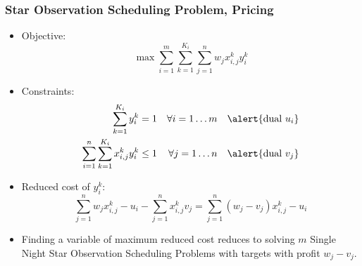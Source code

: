 \documentclass[10pt]{beamer}
\begin{document}
\begin{frame}
  \frametitle{Star Observation Scheduling Problem, Pricing}

  \begin{itemize}
    \item Objective:
      \begin{displaymath}
        \max \sum_{i = 1}^m \sum_{k = 1}^{K_i} \sum_{j = 1}^n w_j x_{i, j}^k y_i^k
      \end{displaymath}

    \item Constraints:
      \begin{align*}
        \sum_{k = 1}^{K_i} y_i^k = 1 && \forall i = 1 \dots m && \alert{\text{dual } u_i} \\
        \sum_{i = 1}^n \sum_{k = 1}^{K_i} x_{i, j}^k y_i^k \le 1 && \forall j = 1 \dots n && \alert{\text{dual } v_j} \\
      \end{align*}

    \item \pause Reduced cost of $y_i^k$:
      \begin{displaymath}
        \sum_{j = 1}^n w_j x_{i, j}^k - u_i - \sum_{j = 1}^n x_{i, j}^k v_j
        = \sum_{j = 1}^n (w_j - v_j) x_{i, j}^k - u_i
      \end{displaymath}

    \item \pause Finding a variable of maximum reduced cost reduces to solving $m$ Single Night Star Observation Scheduling Problems with targets with profit $w_j - v_j$.
  \end{itemize}
\end{frame}
\end{document}
